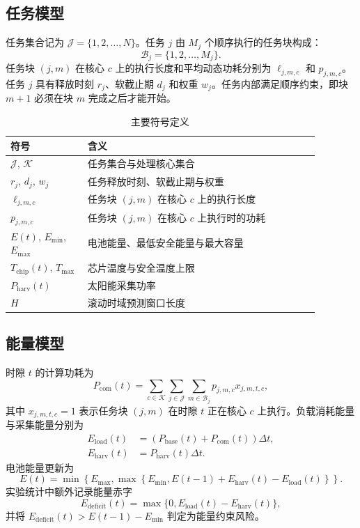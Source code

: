 \documentclass[conference]{IEEEtran}
\begin{document}
\subsection{任务模型}

任务集合记为 $\mathcal{J}=\{1,2,\dots,N\}$。任务 $j$ 由 $M_j$ 个顺序执行的任务块构成：
\begin{equation}
  \mathcal{B}_j=\{1,2,\dots,M_j\}.
\end{equation}
任务块 $(j,m)$ 在核心 $c$ 上的执行长度和平均动态功耗分别为 $\ell_{j,m,c}$ 和 $p_{j,m,c}$。任务 $j$ 具有释放时刻 $r_j$、软截止期 $d_j$ 和权重 $w_j$。任务内部满足顺序约束，即块 $m+1$ 必须在块 $m$ 完成之后才能开始。

\begin{table}[t]
\centering
\caption{主要符号定义}
\label{tab:notation}
\begin{tabular}{p{0.22\linewidth}p{0.66\linewidth}}
\toprule
符号 & 含义 \\
\midrule
$\mathcal{J}$, $\mathcal{K}$ & 任务集合与处理核心集合 \\
$r_j$, $d_j$, $w_j$ & 任务释放时刻、软截止期与权重 \\
$\ell_{j,m,c}$ & 任务块 $(j,m)$ 在核心 $c$ 上的执行长度 \\
$p_{j,m,c}$ & 任务块 $(j,m)$ 在核心 $c$ 上执行时的功耗 \\
$E(t)$, $E_{\min}$, $E_{\max}$ & 电池能量、最低安全能量与最大容量 \\
$T_{\mathrm{chip}}(t)$, $T_{\max}$ & 芯片温度与安全温度上限 \\
$P_{\mathrm{harv}}(t)$ & 太阳能采集功率 \\
$H$ & 滚动时域预测窗口长度 \\
\bottomrule
\end{tabular}
\end{table}

\subsection{能量模型}

时隙 $t$ 的计算功耗为
\begin{equation}
  P_{\mathrm{com}}(t)=
  \sum_{c\in\mathcal{K}}\sum_{j\in\mathcal{J}}\sum_{m\in\mathcal{B}_j}
  p_{j,m,c} x_{j,m,t,c},
\end{equation}
其中 $x_{j,m,t,c}=1$ 表示任务块 $(j,m)$ 在时隙 $t$ 正在核心 $c$ 上执行。负载消耗能量与采集能量分别为
\begin{align}
  E_{\mathrm{load}}(t) &= \left(P_{\mathrm{base}}(t)+P_{\mathrm{com}}(t)\right)\Delta t,\\
  E_{\mathrm{harv}}(t) &= P_{\mathrm{harv}}(t)\Delta t.
\end{align}
电池能量更新为
\begin{equation}
  E(t)=\min\left\{E_{\max},\max\left\{E_{\min},E(t-1)+E_{\mathrm{harv}}(t)-E_{\mathrm{load}}(t)\right\}\right\}.
\end{equation}
实验统计中额外记录能量赤字
\begin{equation}
  E_{\mathrm{deficit}}(t)=
  \max\{0,E_{\mathrm{load}}(t)-E_{\mathrm{harv}}(t)\},
\end{equation}
并将 $E_{\mathrm{deficit}}(t)>E(t-1)-E_{\min}$ 判定为能量约束风险。
\end{document}
